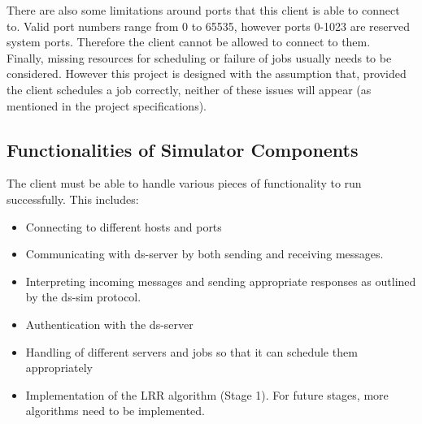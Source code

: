 \vspace{.2cm}
There are also some limitations around ports that this client is able to connect to. Valid port numbers range from 0 to 65535, however ports 0-1023 are reserved system ports. Therefore the client cannot be allowed to connect to them. \\

\vspace{.2cm}
Finally, missing resources for scheduling or failure of jobs usually needs to be considered. However this project is designed with the assumption that, provided the client schedules a job correctly, neither of these issues will appear (as mentioned in the project specifications).


\subsection{Functionalities of Simulator Components}
The client must be able to handle various pieces of functionality to run successfully. This includes:
\begin{itemize}
    \item Connecting to different hosts and ports
    \item Communicating with ds-server by both sending and receiving messages.
    \item Interpreting incoming messages and sending appropriate responses as outlined by the ds-sim protocol.
    \item Authentication with the ds-server
    \item Handling of different servers and jobs so that it can schedule them appropriately
    \item Implementation of the LRR algorithm (Stage 1). For future stages, more algorithms need to be implemented.
\end{itemize}